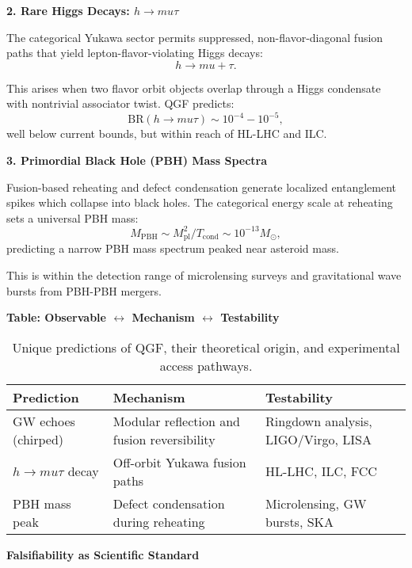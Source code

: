 \documentclass[11pt]{article}
\def\mu{mu}
\begin{document}
\vspace{0.5em}
\noindent\textbf{2. Rare Higgs Decays: \( h \rightarrow \mu \tau \)}

The categorical Yukawa sector permits suppressed, non-flavor-diagonal fusion paths that yield lepton-flavor-violating Higgs decays:
\[
h \rightarrow \mu + \tau.
\]

This arises when two flavor orbit objects overlap through a Higgs condensate with nontrivial associator twist. QGF predicts:
\[
\text{BR}(h \rightarrow \mu \tau) \sim 10^{-4} - 10^{-5},
\]
well below current bounds, but within reach of HL-LHC and ILC.

\vspace{0.5em}
\noindent\textbf{3. Primordial Black Hole (PBH) Mass Spectra}

Fusion-based reheating and defect condensation generate localized entanglement spikes which collapse into black holes. The categorical energy scale at reheating sets a universal PBH mass:
\[
M_{\text{PBH}} \sim M_{\text{pl}}^2 / T_{\text{cond}} \sim 10^{-13} M_\odot,
\]
predicting a narrow PBH mass spectrum peaked near asteroid mass.

This is within the detection range of microlensing surveys and gravitational wave bursts from PBH-PBH mergers.

\vspace{0.5em}
\textbf{Table: Observable $\leftrightarrow$ Mechanism $\leftrightarrow$ Testability}


\begin{table}[H]
\centering
\renewcommand{\arraystretch}{1.2}
\begin{tabular}{|p{3.5cm}|p{6cm}|p{3.8cm}|}
\hline
\textbf{Prediction} & \textbf{Mechanism} & \textbf{Testability} \\
\hline
GW echoes (chirped) & Modular reflection and fusion reversibility & Ringdown analysis, LIGO/Virgo, LISA \\
\hline
\( h \rightarrow \mu \tau \) decay & Off-orbit Yukawa fusion paths & HL-LHC, ILC, FCC \\
\hline
PBH mass peak & Defect condensation during reheating & Microlensing, GW bursts, SKA \\
\hline
\end{tabular}
\caption{Unique predictions of QGF, their theoretical origin, and experimental access pathways.}
\label{tab:qgf-predictions}
\end{table}

\vspace{0.5em}
\noindent\textbf{Falsifiability as Scientific Standard}
\end{document}
